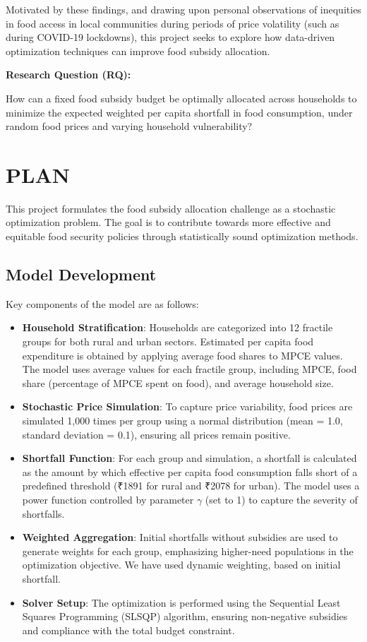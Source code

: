 \documentclass[12pt]{article}
\begin{document}
Motivated by these findings, and drawing upon personal observations of inequities in food access in local communities during periods of price volatility (such as during COVID-19 lockdowns), this project seeks to explore how data-driven optimization techniques can improve food subsidy allocation.

\textbf{Research Question (RQ):}

How can a fixed food subsidy budget be optimally allocated across households to minimize the expected weighted per capita shortfall in food consumption, under random food prices and varying household vulnerability?


\section{PLAN}
This project formulates the food subsidy allocation challenge as a stochastic optimization problem. The goal is to contribute towards more effective and equitable food security policies through statistically sound optimization methods.

\subsection{Model Development}
Key components of the model are as follows:
\begin{itemize}
    \item \textbf{Household Stratification}: Households are categorized into 12 fractile groups for both rural and urban sectors. Estimated per capita food expenditure is obtained by applying average food shares to MPCE values. The model uses average values for each fractile group, including MPCE, food share (percentage of MPCE spent on food), and average household size.
    \item \textbf{Stochastic Price Simulation}: To capture price variability, food prices are simulated 1,000 times per group using a normal distribution (mean = 1.0, standard deviation = 0.1), ensuring all prices remain positive.
    \item \textbf{Shortfall Function}: For each group and simulation, a shortfall is calculated as the amount by which effective per capita food consumption falls short of a predefined threshold (₹1891 for rural and ₹2078 for urban). The model uses a power function controlled by parameter $\gamma$ (set to 1) to capture the severity of shortfalls.
    \item \textbf{Weighted Aggregation}: Initial shortfalls without subsidies are used to generate weights for each group, emphasizing higher-need populations in the optimization objective. We have used dynamic weighting, based on initial shortfall.
    \item \textbf{Solver Setup}: The optimization is performed using the Sequential Least Squares Programming (SLSQP) algorithm, ensuring non-negative subsidies and compliance with the total budget constraint.
\end{itemize}
\end{document}
